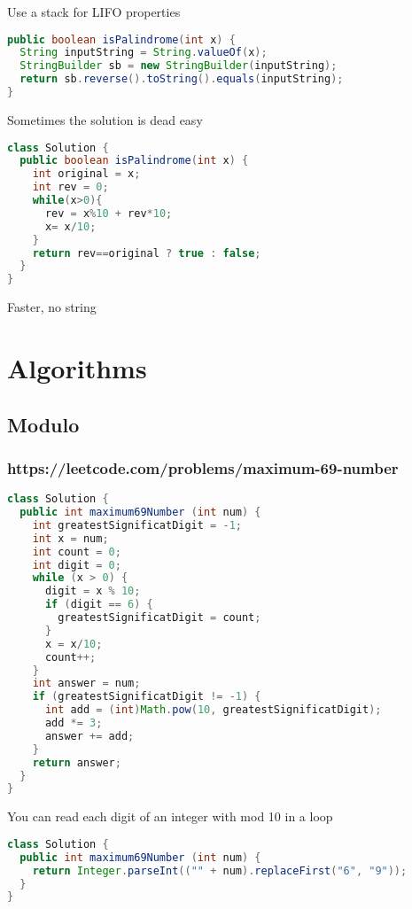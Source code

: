 \documentclass[12pt]{article}
\begin{document}
Use a stack for LIFO properties

\begin{lstlisting}[language=Java]
public boolean isPalindrome(int x) {
  String inputString = String.valueOf(x);
  StringBuilder sb = new StringBuilder(inputString);
  return sb.reverse().toString().equals(inputString);
}
\end{lstlisting}

Sometimes the solution is dead easy

\begin{lstlisting}[language=Java]
class Solution {
  public boolean isPalindrome(int x) {
    int original = x;
    int rev = 0;
    while(x>0){
      rev = x%10 + rev*10;
      x= x/10;
    }
    return rev==original ? true : false;
  }
}
\end{lstlisting}

Faster, no string

\section{Algorithms}
\subsection{Modulo} 
\subsubsection{https://leetcode.com/problems/maximum-69-number}

\begin{lstlisting}[language=Java]
class Solution {
  public int maximum69Number (int num) {
    int greatestSignificatDigit = -1;
    int x = num;
    int count = 0;
    int digit = 0;
    while (x > 0) {
      digit = x % 10;
      if (digit == 6) {
        greatestSignificatDigit = count;
      }
      x = x/10;
      count++;
    }
    int answer = num;
    if (greatestSignificatDigit != -1) {
      int add = (int)Math.pow(10, greatestSignificatDigit);
      add *= 3;
      answer += add;
    }
    return answer;
  }
}
\end{lstlisting}

You can read each digit of an integer with mod 10 in a loop

\begin{lstlisting}[language=Java]
class Solution {
  public int maximum69Number (int num) {
    return Integer.parseInt(("" + num).replaceFirst("6", "9"));
  }
}
\end{lstlisting}
\end{document}

